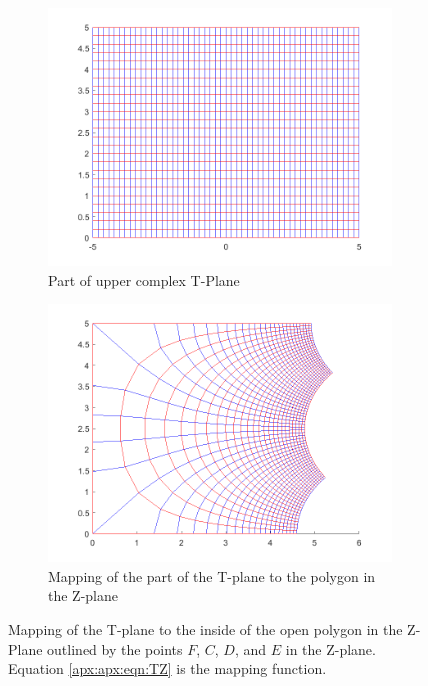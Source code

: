     \begin{figure}[h]
    \centering
    \begin{subfigure}[t]{0.45\textwidth}
        \centering
        \includegraphics[width=\textwidth]{images/TtoZ_strip.png}
        \caption{Part of upper complex T-Plane}
    \end{subfigure}
    \hfill
    \begin{subfigure}[t]{0.45\textwidth}
        \centering
        \includegraphics[width=\textwidth]{images/TtoZ_map.png}
        \caption{Mapping of the part of the T-plane to the polygon in the Z-plane}
    \end{subfigure} 
    \caption[Mapping of the T-plane to the inside of the open polygon in the Z-Plane]{Mapping of the T-plane to the inside of the open polygon in the Z-Plane outlined by the points $F$, $C$, $D$, and $E$ in the Z-plane. Equation \ref{apx:apx:eqn:TZ} is the mapping function.} 
    \label{apx:apx:fig:T_to_Z_mapping_apx}
 \end{figure}
 
